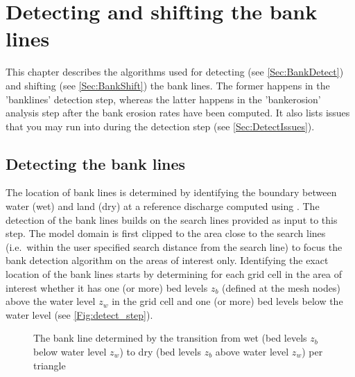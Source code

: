 \chapter{Detecting and shifting the bank lines} \label{Chp:BankDetect}

This chapter describes the algorithms used for detecting (see \autoref{Sec:BankDetect}) and shifting (see \autoref{Sec:BankShift}) the bank lines.
The former happens in the 'banklines' detection step, whereas the latter happens in the 'bankerosion' analysis step after the bank erosion rates have been computed.
It also lists issues that you may run into during the detection step (see \autoref{Sec:DetectIssues}).

\section{Detecting the bank lines} \label{Sec:BankDetect}

The location of bank lines is determined by identifying the boundary between water (wet) and land (dry) at a reference discharge computed using \dflowfm.
The detection of the bank lines builds on the search lines provided as input to this step.
The model domain is first clipped to the area close to the search lines (i.e.~within the user specified search distance from the search line) to focus the bank detection algorithm on the areas of interest only.
Identifying the exact location of the bank lines starts by determining for each grid cell in the area of interest whether it has one (or more) bed levels $z_b$ (defined at the mesh nodes) above the water level $z_w$ in the grid cell and one (or more) bed levels below the water level (see \autoref{Fig:detect_step}).


\begin{figure}[!h]
\center
\resizebox{5cm}{!}{
   
}
\caption{The bank line determined by the transition from wet (bed levels $z_b$ below water level $z_w$) to dry (bed levels $z_b$ above water level $z_w$) per triangle}
\label{Fig:detect_step}
\end{figure}

